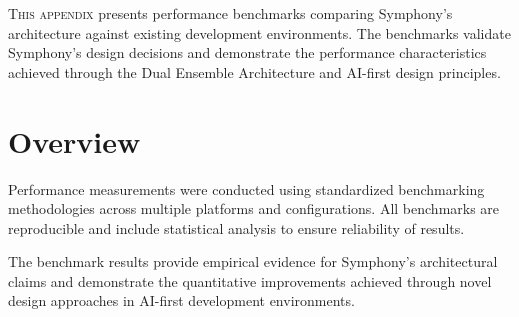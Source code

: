 \label{app:performance-benchmarks}


\lettrine{T}{his appendix} presents performance benchmarks comparing Symphony's architecture against existing development environments. The benchmarks validate Symphony's design decisions and demonstrate the performance characteristics achieved through the Dual Ensemble Architecture and AI-first design principles.

\section*{Overview}

Performance measurements were conducted using standardized benchmarking methodologies across multiple platforms and configurations. All benchmarks are reproducible and include statistical analysis to ensure reliability of results.

The benchmark results provide empirical evidence for Symphony's architectural claims and demonstrate the quantitative improvements achieved through novel design approaches in AI-first development environments.





